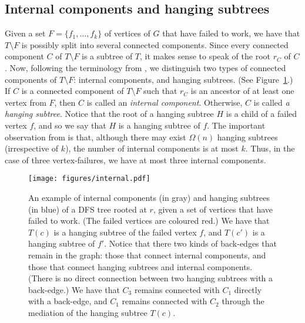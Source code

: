 \documentclass[11pt,a4paper]{article}
\begin{document}
\subsection{Internal components and hanging subtrees} 
\label{section:internalAndHanging}
Given a set $F=\{f_1,\dots,f_k\}$ of vertices of $G$ that have failed to work, we have that $T\setminus F$ is possibly split into several connected components. Since every connected component $C$ of $T\setminus F$ is a  subtree of $T$, it makes sense to speak of the root $r_C$ of $C$. Now, following the terminology from \cite{DBLP:conf/esa/Kosinas23}, we distinguish two types of connected components of $T\setminus F$: internal components, and hanging subtrees. (See Figure~\ref{figure:internal}.) If $C$ is a connected component of $T\setminus F$ such that $r_C$ is an ancestor of at least one vertex from $F$, then $C$ is called an \emph{internal component}. Otherwise, $C$ is called \emph{a hanging subtree}. Notice that the root of a hanging subtree $H$ is a child of a failed vertex $f$, and so we say that $H$ is a hanging subtree of $f$. The important observation from \cite{DBLP:conf/esa/Kosinas23} is that, although there may exist $\Omega(n)$ hanging subtrees (irrespective of $k$), the number of internal components is at most $k$. Thus, in the case of three vertex-failures, we have at most three internal components.

\begin{figure}[h!]\centering
\texttt{[image: figures/internal.pdf]}
\caption{\small{An example of internal components (in gray) and hanging subtrees (in blue) of a DFS tree rooted at $r$, given a set of vertices that have failed to work. (The failed vertices are coloured red.) We have that $T(c)$ is a hanging subtree of the failed vertex $f$, and $T(c')$ is a hanging subtree of $f'$. Notice that there two kinds of back-edges that remain in the graph: those that connect internal components, and those that connect hanging subtrees and internal components. (There is no direct connection between two hanging subtrees with a back-edge.) We have that $C_3$ remains connected with $C_1$ directly with a back-edge, and $C_1$ remains connected with $C_2$ through the mediation of the hanging subtree $T(c)$.}}\label{figure:internal}
\end{figure}  
\end{document}
